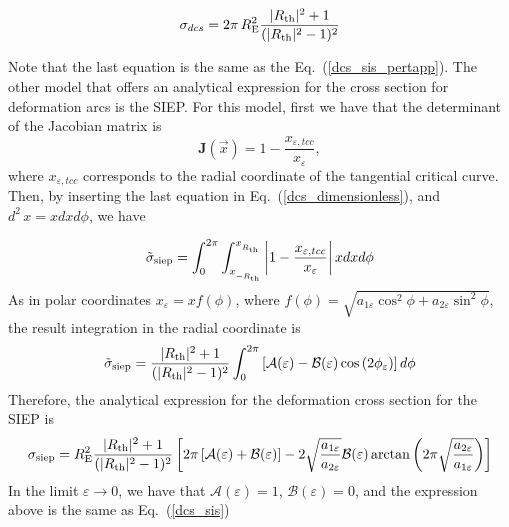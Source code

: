 \begin{equation}
\sigma_{dcs}=2\pi\,R^2_{\rm E} \dfrac{|R_{\rm th}|^2+1}{(|R_{\rm th}|^2-1)^2} \label{dcs_sis}
\end{equation}

Note that the last equation is the same as the Eq.~(\ref{dcs_sis_pertapp}). The other model that offers an analytical expression for the cross section for deformation arcs is the SIEP. For this model, first we have that the determinant of the Jacobian matrix is
\begin{equation}
\mathbf{J}(\vec{x})=1-\dfrac{x_{\varepsilon,tcc}}{x_{\varepsilon}}, \label{jacob_siep}
\end{equation}
where $x_{\varepsilon,tcc}$ corresponds to the radial coordinate of the tangential critical curve. Then, by inserting the last equation in Eq.~(\ref{dcs_dimensionless}), and $d^2\,x=xdx d\phi$, we have

\begin{equation}
\tilde{\sigma}_{\rm siep}= \int_{0}^{2\pi}\int_{x_{_{-R_{\rm th}}}}^{x_{_{R_{\rm th}}}}\left| 1-\dfrac{x_{\varepsilon,tcc}}{x_{\varepsilon}}\right| x dx d\phi 
\end{equation}
As in polar coordinates $x_{\varepsilon}=xf(\phi)$, where $f(\phi)=\sqrt{a_{1\varepsilon}\cos^2{\phi}+a_{2\varepsilon}\sin^2{\phi}}$, the result integration in the radial coordinate is
\begin{equation}
\tilde{\sigma}_{\rm siep}= \dfrac{|R_{\rm th}|^2+1}{(|R_{\rm th}|^2-1)^2} \int_{0}^{2\pi}\left[\mathcal{A}(\varepsilon)-\mathcal{B}(\varepsilon)\cos{(2\phi_\varepsilon)} \right] d\phi 
\end{equation}
Therefore, the analytical expression for the deformation cross section for the SIEP is
 \begin{equation}
\sigma_{\rm siep}= R^2_{\rm E}\dfrac{|R_{\rm th}|^2+1}{(|R_{\rm th}|^2-1)^2} \left[2\pi\left[\mathcal{A}(\varepsilon)+\mathcal{B}(\varepsilon)\right]-2\sqrt{\dfrac{a_{1\varepsilon}}{a_{2\varepsilon}}}\mathcal{B}(\varepsilon)\arctan{\left(2\pi\sqrt{\dfrac{a_{2\varepsilon}}{a_{1\varepsilon}}}\right)} \right]
\end{equation}
In the limit $\varepsilon \rightarrow 0$, we have that $\mathcal{A}(\varepsilon)=1$, $\mathcal{B}(\varepsilon)=0$, and the expression above is the same as Eq.~(\ref{dcs_sis})

